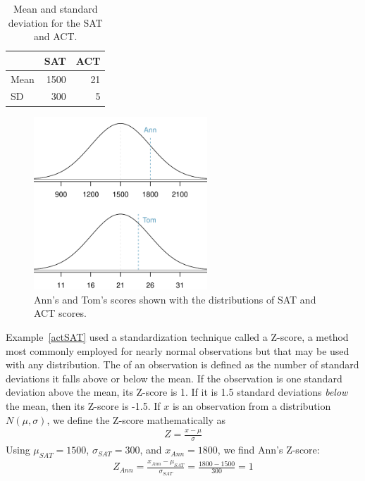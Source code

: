 \begin{table}
\centering
\begin{tabular}{l r r}
  \hline
  & SAT & ACT \\
  \hline
Mean \hspace{0.3cm} & 1500 & 21 \\
SD & 300 & 5 \\
   \hline
\end{tabular}
\caption{Mean and standard deviation for the SAT and ACT.}
\label{satACTstats}
\end{table}

\begin{figure}
\centering
\includegraphics[width=65mm]{ch_distributions/figures/satActNormals/satActNormals}
\caption{Ann's and Tom's scores shown with the distributions of SAT and ACT scores.}
\label{satActNormals}
\end{figure}

Example~\ref{actSAT} used a standardization technique called a Z-score, a method most commonly employed for nearly normal observations but that may be used with any distribution. The  of an observation is defined as the number of standard deviations it falls above or below the mean. If the observation is one standard deviation above the mean, its Z-score is 1. If it is 1.5 standard deviations \emph{below} the mean, then its Z-score is -1.5. If $x$ is an observation from a distribution $N(\mu, \sigma)$, we define the Z-score mathematically as
\begin{eqnarray*}
Z = \frac{x-\mu}{\sigma}
\end{eqnarray*}
Using $\mu_{SAT}=1500$, $\sigma_{SAT}=300$, and $x_{Ann}=1800$, we find Ann's Z-score:
\begin{eqnarray*}
Z_{Ann} = \frac{x_{Ann} - \mu_{SAT}}{\sigma_{SAT}} = \frac{1800-1500}{300} = 1
\end{eqnarray*}

